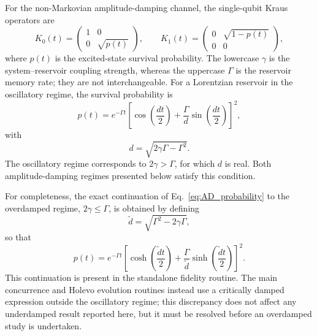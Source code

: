\documentclass[aps,prb,twocolumn,superscriptaddress,longbibliography]{revtex4-2}
\begin{document}
For the non-Markovian amplitude-damping channel, the single-qubit
Kraus operators are
%
\begin{equation}\boxed{
K_{0}(t)
=
\begin{pmatrix}
1 & 0 \\
0 & \sqrt{p(t)}
\end{pmatrix},
\qquad
K_{1}(t)
=
\begin{pmatrix}
0 & \sqrt{1-p(t)} \\
0 & 0
\end{pmatrix},
}\label{eq:AD_kraus}\end{equation}
%
where $p(t)$ is the excited-state survival probability. The lowercase
$\gamma$ is the system--reservoir coupling strength, whereas the uppercase
$\Gamma$ is the reservoir memory rate; they are not interchangeable.
For a Lorentzian reservoir in the oscillatory regime, the survival
probability is
%
\begin{equation}\boxed{
p(t)
=
e^{-\Gamma t}
\left[
\cos\left(\frac{dt}{2}\right)
+
\frac{\Gamma}{d}
\sin\left(\frac{dt}{2}\right)
\right]^2,
}\label{eq:AD_probability}\end{equation}
%
with
%
\begin{equation}\boxed{
d
=
\sqrt{2\gamma\Gamma-\Gamma^2}.
}\label{eq:d_parameter}\end{equation}
%
The oscillatory regime corresponds to $2\gamma>\Gamma$, for which $d$
is real. Both amplitude-damping regimes presented below satisfy this
condition.

For completeness, the exact continuation of Eq.~\eqref{eq:AD_probability}
to the overdamped regime, $2\gamma\leq\Gamma$, is obtained by defining
%
\begin{equation}\boxed{
\tilde d
=
\sqrt{\Gamma^2-2\gamma\Gamma},
}\end{equation}
%
so that
%
\begin{equation}\boxed{
p(t)
=
e^{-\Gamma t}
\left[
\cosh\left(\frac{\tilde d t}{2}\right)
+
\frac{\Gamma}{\tilde d}
\sinh\left(\frac{\tilde d t}{2}\right)
\right]^2.
}\label{eq:AD_probability_overdamped}\end{equation}
%
This continuation is present in the standalone fidelity routine. The main
concurrence and Holevo evolution routines instead use a critically damped
expression outside the oscillatory regime; this discrepancy does not affect
any underdamped result reported here, but it must be resolved before an
overdamped study is undertaken.
\end{document}
